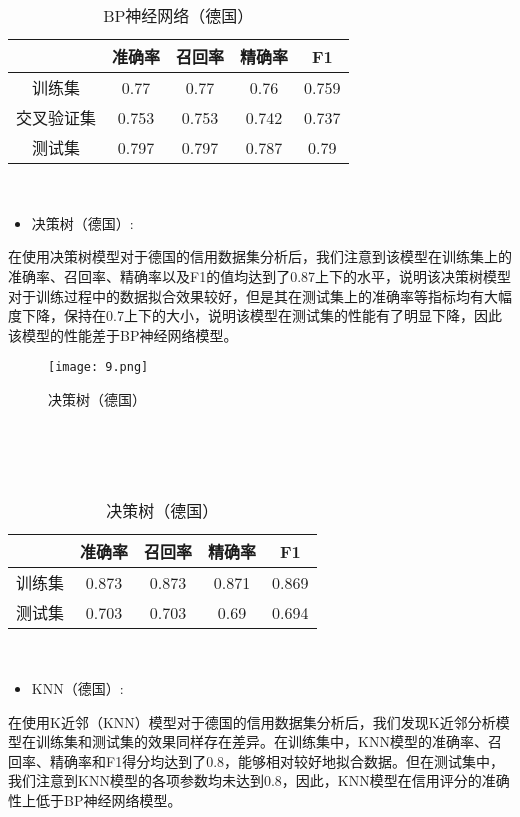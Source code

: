 \documentclass[12pt,a4paper]{nmmcm}
\begin{document}
\\
\\
\begin{table}[H]
    \centering
     \caption{BP神经网络（德国）}
\begin{tabular}{ccccc}
 \hline
      & 准确率   & 召回率   & 精确率   & F1    \\
       \hline
训练集   & 0.77  & 0.77  & 0.76  & 0.759 \\
交叉验证集 & 0.753 & 0.753 & 0.742 & 0.737 \\
测试集   & 0.797 & 0.797 & 0.787 & 0.79 \\
 \hline
\end{tabular}
\end{table}
\\
\begin{itemize}
   \item
决策树（德国）:
\end{itemize}
在使用决策树模型对于德国的信用数据集分析后，我们注意到该模型在训练集上的准确率、召回率、精确率以及F1的值均达到了0.87上下的水平，说明该决策树模型对于训练过程中的数据拟合效果较好，但是其在测试集上的准确率等指标均有大幅度下降，保持在0.7上下的大小，说明该模型在测试集的性能有了明显下降，因此该模型的性能差于BP神经网络模型。
\begin{figure}
    \centering
      
    \texttt{[image: 9.png]}
    \label{fig:enter-label}
      \caption{决策树（德国）}
\end{figure}

\\
\\
\\\begin{table}[H]
\centering
 \caption{决策树（德国）}
\begin{tabular}{ccccc}
\hline
 & 准确率   & 召回率   & 精确率   & F1    \\
\hline
训练集   & 0.873 &0.873& 0.871& 0.869\\
测试集   & 0.703& 0.703 & 0.69 & 0.694  \\
\hline
\end{tabular}
\end{table}


\\
\begin{itemize}
   \item
KNN（德国）:
\end{itemize}
在使用K近邻（KNN）模型对于德国的信用数据集分析后，我们发现K近邻分析模型在训练集和测试集的效果同样存在差异。在训练集中，KNN模型的准确率、召回率、精确率和F1得分均达到了0.8，能够相对较好地拟合数据。但在测试集中，我们注意到KNN模型的各项参数均未达到0.8，因此，KNN模型在信用评分的准确性上低于BP神经网络模型。
\\
\end{document}
